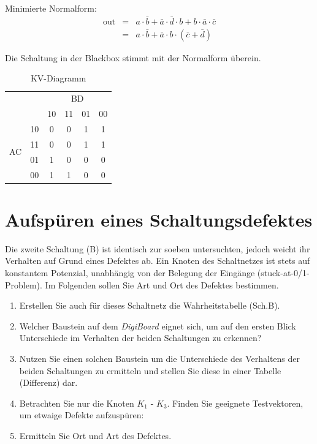 \documentclass[10pt]{scrreprt}
\begin{document}
    Minimierte Normalform:
    \begin{eqnarray*}
        \text{out} &=& a\cdot \bar{b} + \bar{a} \cdot \bar{d} \cdot b + b \cdot \bar{a} \cdot \bar{c}\\
            &=& a \cdot \bar{b} + \bar{a} \cdot b \cdot (\bar{c} + \bar{d})
    \end{eqnarray*}

    Die Schaltung in der Blackbox stimmt mit der Normalform überein.

    \begin{table}
        \centering
        \begin{tabular}{cc|cccc}
            & &  & \multicolumn{2}{c}{BD}\\
            & & 10 & 11 & 01 & 00\\
            \midrule
             & 10 & 0 & 0 & 1 & 1\\
            \multirow{ 2}{*}{AC} & 11 & 0 & 0 & 1 & 1\\
             & 01 & 1 & 0 & 0 & 0\\
             & 00 & 1 & 1 & 0 & 0
        \end{tabular}
        \caption{KV-Diagramm}
    \end{table}


    \section{Aufspüren eines Schaltungsdefektes}
    Die zweite Schaltung (B) ist identisch zur soeben untersuchten, jedoch weicht ihr Verhalten
    auf Grund eines Defektes ab. Ein Knoten des Schaltnetzes ist stets auf konstantem
    Potenzial, unabhängig von der Belegung der Eingänge (stuck-at-0/1-Problem). Im Folgenden
    sollen Sie Art und Ort des Defektes bestimmen.
    \begin{enumerate}
        \item Erstellen Sie auch für dieses Schaltnetz die Wahrheitstabelle (Sch.B).
        \item Welcher Baustein auf dem \textit{DigiBoard} eignet sich, um auf den ersten Blick
            Unterschiede im Verhalten der beiden Schaltungen zu erkennen?
        \item Nutzen Sie einen solchen Baustein um die Unterschiede des Verhaltens der beiden
            Schaltungen zu ermitteln und stellen Sie diese in einer Tabelle (Differenz) dar.
        \item Betrachten Sie nur die Knoten $K_1$ - $K_3$. Finden Sie geeignete Testvektoren, um
            etwaige Defekte aufzuspüren:
        \item Ermitteln Sie Ort und Art des Defektes.
    \end{enumerate}
\end{document}
